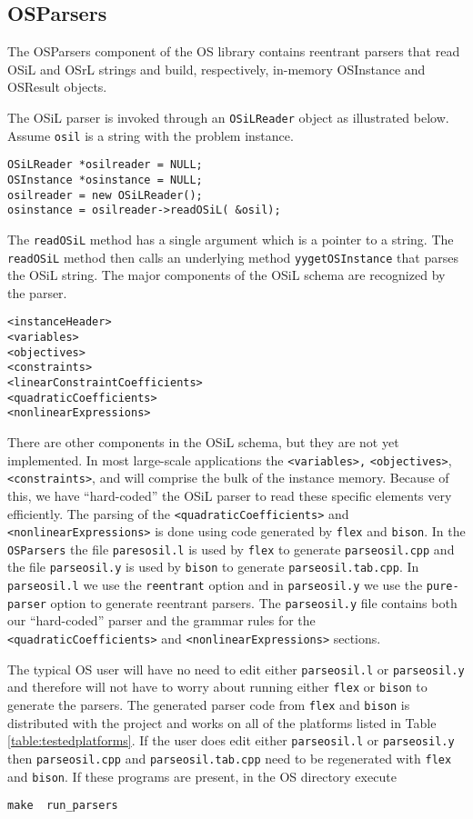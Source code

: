 \documentclass[11pt]{article}
\renewcommand{\_}{{\char"5F}}
\renewcommand{\{}{{\char"7B}}
\renewcommand{\}}{{\char"7D}}
\renewcommand{\^}{{\char"0D}}
\renewcommand{\'}{{\char"0D}}
\begin{document}
\subsection{OSParsers}

The OSParsers component of the OS library contains reentrant parsers that  read OSiL and OSrL strings and build, respectively, in-memory OSInstance and OSResult  objects. 


The OSiL parser is invoked through an {\tt OSiLReader} object as illustrated below. Assume {\tt osil} is a string with the problem instance.
\begin{verbatim}
OSiLReader *osilreader = NULL;
OSInstance *osinstance = NULL;
osilreader = new OSiLReader(); 
osinstance = osilreader->readOSiL( &osil);
\end{verbatim}
The {\tt  readOSiL} method  has a single argument which is a pointer to a string. The {\tt  readOSiL} method then calls an underlying method {\tt yygetOSInstance} that parses the OSiL string. The major components of the OSiL schema are recognized by the parser.
\begin{verbatim}
<instanceHeader>
<variables>
<objectives>
<constraints>
<linearConstraintCoefficients>
<quadraticCoefficients>
<nonlinearExpressions>
\end{verbatim}
There are other components in the OSiL schema, but they are not yet implemented. In most large-scale applications the {\tt <variables>,} {\tt <objectives>}, {\tt <constraints>}, and {\tt }  will comprise the bulk of the instance memory.  Because of this, we have ``hard-coded'' the OSiL parser to read these specific elements very efficiently. The parsing of the {\tt <quadraticCoefficients>} and {\tt <nonlinearExpressions>} is done using code generated by {\tt flex} and {\tt bison}. In the {\tt OSParsers}  the file  {\tt paresosil.l} is used by {\tt flex} to generate {\tt parseosil.cpp} and the file {\tt parseosil.y} is used by {\tt bison} to generate {\tt parseosil.tab.cpp}.  In {\tt parseosil.l} we use the {\tt reentrant} option and in {\tt parseosil.y} we use the {\tt pure-parser} option to generate reentrant parsers. The {\tt parseosil.y} file  contains both our  ``hard-coded'' parser and the grammar rules for the  {\tt <quadraticCoefficients>} and {\tt <nonlinearExpressions>} sections. 

The typical OS user will have no need to edit either {\tt parseosil.l} or {\tt parseosil.y} and therefore will not have to worry about running either {\tt flex} or {\tt bison} to generate the parsers. The generated parser code from {\tt flex} and {\tt bison} is distributed with the project and works on all of the platforms listed in Table \ref{table:testedplatforms}.  If the user does edit either {\tt parseosil.l} or {\tt parseosil.y} then {\tt parseosil.cpp} and {\tt parseosil.tab.cpp} need to be regenerated with {\tt flex} and {\tt bison}. If these programs are present, in the OS directory  execute
\begin{verbatim}
make  run_parsers
\end{verbatim}
\end{document}
